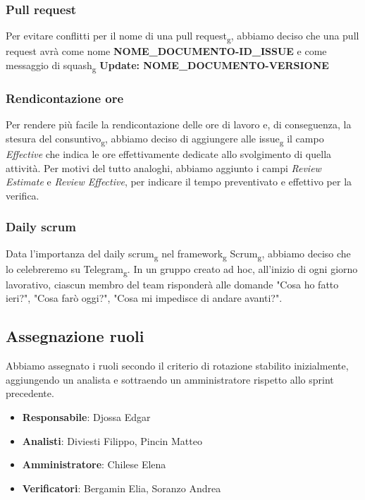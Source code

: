         \subsubsection{Pull request}
            Per evitare conflitti per il nome di una pull request\textsubscript{g}, abbiamo
            deciso che una pull request avrà come nome \textbf{NOME\_DOCUMENTO-ID\_ISSUE} e
            come messaggio di squash\textsubscript{g} \textbf{Update: NOME\_DOCUMENTO-VERSIONE}
        \subsubsection{Rendicontazione ore}
            Per rendere più facile la rendicontazione delle ore di lavoro e, di
            conseguenza, la stesura del consuntivo\textsubscript{g}, abbiamo deciso di aggiungere alle
            issue\textsubscript{g} il campo \textit{Effective} che indica le ore
            effettivamente dedicate allo svolgimento di quella attività. Per motivi del
            tutto analoghi, abbiamo aggiunto i campi \textit{Review
                Estimate} e \textit{Review Effective}, per indicare il tempo preventivato e 
                effettivo per la verifica.
        \subsubsection{Daily scrum}
            Data l'importanza del daily scrum\textsubscript{g} nel
            framework\textsubscript{g} Scrum\textsubscript{g}, abbiamo deciso che lo
            celebreremo su Telegram\textsubscript{g}. In un gruppo creato ad hoc,
            all'inizio di ogni giorno lavorativo, ciascun membro del team risponderà alle
            domande "Cosa ho fatto ieri?", "Cosa farò oggi?", "Cosa mi impedisce di andare
            avanti?".
    \subsection{Assegnazione ruoli}
        Abbiamo assegnato i ruoli secondo il criterio di rotazione stabilito inizialmente,
        aggiungendo un analista e sottraendo un amministratore rispetto allo sprint precedente.
        \begin{itemize}
            \item \textbf{Responsabile}: Djossa Edgar
            \item \textbf{Analisti}: Diviesti Filippo, Pincin Matteo
            \item \textbf{Amministratore}: Chilese Elena
            \item \textbf{Verificatori}: Bergamin Elia, Soranzo Andrea
        \end{itemize}


